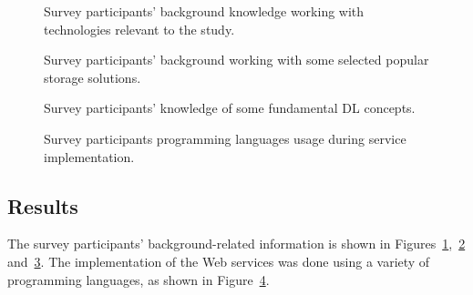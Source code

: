 \begin{figure}
 \centering
 \framebox[\textwidth]{
 
 }
 \caption[Survey participants' technological background]{Survey participants' background knowledge working with technologies relevant to the study.}
 \label{fig:experimentation:survey:background-technology-experience}
\end{figure}

\begin{figure}
 \centering
 \framebox[\textwidth]{
 
 }
 \caption[Survey participants' background using storage solutions]{Survey participants' background working with some selected popular storage solutions.}
 \label{fig:experimentation:survey:background-storage-usage-frequency}
\end{figure}

\begin{figure}
 \centering
 \framebox[\textwidth]{
 
 }
 \caption[Survey participants' knowledge of DL concepts]{Survey participants' knowledge of some fundamental DL concepts.}
 \label{fig:experimentation:survey:background-dl-concepts-skill-level}
\end{figure}

\begin{figure}
 \centering
 \framebox[\textwidth]{
 
 }
 \caption[Survey participants' programming languages usage]{Survey participants programming languages usage during service implementation.}
 \label{fig:experimentation:survey:programming-language-usage}
\end{figure}

\subsection{Results}
\label{sec:evaluation:developer-survey:results}

The survey participants' background-related information is shown in Figures~\ref{fig:experimentation:survey:background-technology-experience},~\ref{fig:experimentation:survey:background-storage-usage-frequency} and~\ref{fig:experimentation:survey:background-dl-concepts-skill-level}. The implementation of the Web services was done using a variety of programming languages, as shown in Figure~\ref{fig:experimentation:survey:programming-language-usage}.

